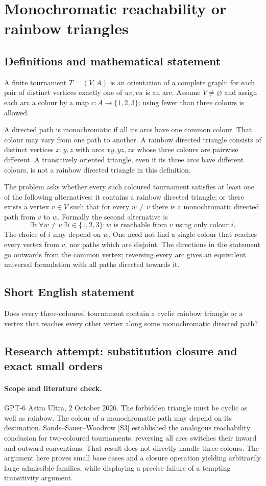 \documentclass[11pt,a4paper]{article}
\begin{document}
\section*{Monochromatic reachability or rainbow triangles}\label{statement}

\subsection{Definitions and mathematical statement}
A finite tournament $T=(V,A)$ is an orientation of a complete graph:
for each pair of distinct vertices exactly one of $uv,vu$ is an arc.
Assume $V\ne\varnothing$ and assign each arc a colour by a map
$c:A\to\{1,2,3\}$; using fewer than three colours is allowed.

A directed path is monochromatic if all its arcs have one common
colour. That colour may vary from one path to another. A rainbow
directed triangle consists of distinct vertices $x,y,z$ with arcs
$xy,yz,zx$ whose three colours are pairwise different. A transitively
oriented triangle, even if its three arcs have different colours,
is not a rainbow directed triangle in this definition.

The problem asks whether every such coloured tournament satisfies at
least one of the following alternatives: it contains a rainbow
directed triangle; or there exists a vertex $v\in V$ such that for
every $w\ne v$ there is a monochromatic directed path from $v$ to $w$.
Formally the second alternative is
\[
 \exists v\ \forall w\ne v\ \exists i\in\{1,2,3\}:
          w\text{ is reachable from }v\text{ using only colour }i.
\]
The choice of $i$ may depend on $w$. One need not find a single colour
that reaches every vertex from $v$, nor paths which are disjoint.
The directions in the statement go outwards from the common vertex;
reversing every arc gives an equivalent universal formulation with
all paths directed towards it.
\subsection{Short English statement}
Does every three-coloured tournament contain a cyclic rainbow triangle or a vertex that reaches every other vertex along some monochromatic directed path?
\subsection{Research attempt: substitution closure and exact small orders}
\paragraph{Scope and literature check.}
GPT-6 Astra Ultra, 2 October 2026. The forbidden triangle must be
cyclic as well as rainbow. The colour of a monochromatic path may
depend on its destination. Sands--Sauer--Woodrow [S3] established
the analogous reachability conclusion for two-coloured tournaments;
reversing all arcs switches their inward and outward conventions.
That result does not directly handle three colours. The argument
here proves small base cases and a closure operation yielding
arbitrarily large admissible families, while displaying a precise
failure of a tempting transitivity argument.
\end{document}
